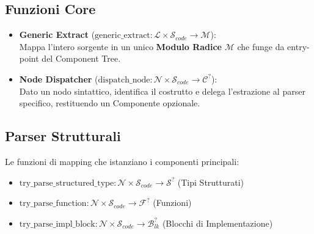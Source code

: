 \subsection{Funzioni Core}
\begin{itemize}
  \item \textbf{Generic Extract} ($\text{generic\_extract} :
    \mathcal{L} \times \mathcal{S}_{code} \to \mathcal{M}$): \\
    Mappa l'intero sorgente in un unico \textbf{Modulo Radice}
    $\mathcal{M}$ che funge da entry-point del Component Tree.
  \item \textbf{Node Dispatcher} ($\text{dispatch\_node} :
    \mathcal{N} \times \mathcal{S}_{code} \to \mathcal{C}^?$): \\
    Dato un nodo sintattico, identifica il costrutto e delega
    l'estrazione al parser specifico, restituendo un Componente opzionale.
\end{itemize}

\subsection{Parser Strutturali}
Le funzioni di mapping che istanziano i componenti principali:
\begin{itemize}
  \item $\text{try\_parse\_structured\_type} : \mathcal{N} \times
    \mathcal{S}_{code} \to \mathcal{S}^?$ (Tipi Strutturati)
  \item $\text{try\_parse\_function} : \mathcal{N} \times
    \mathcal{S}_{code} \to \mathcal{F}^?$ (Funzioni)
  \item $\text{try\_parse\_impl\_block} : \mathcal{N} \times
    \mathcal{S}_{code} \to \mathcal{B}_{lk}^?$ (Blocchi di Implementazione)
\end{itemize}

